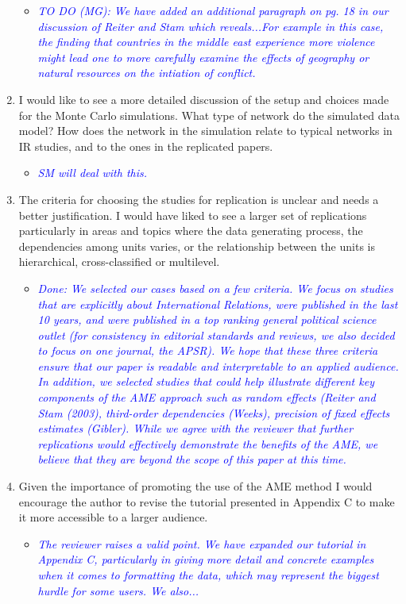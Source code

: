 \begin{enumerate}
	\begin{itemize}
		\item \textcolor{blue}{ \emph{
		TO DO (MG): We have added an additional paragraph on pg. 18 in our discussion of Reiter and Stam which reveals...For example in this case, the finding that countries in the middle east experience more violence might lead one to more carefully examine the effects of geography or natural resources on the intiation of conflict.
		}}
	\end{itemize}
	\item I would like to see a more detailed discussion of the setup and choices made for the Monte Carlo simulations. What type of network do the simulated data model? How does the network in the simulation relate to typical networks in IR studies, and to the ones in the replicated papers.
	\begin{itemize}
		\item \textcolor{blue}{ \emph{
		SM will deal with this.
		}}
	\end{itemize}
	\item The criteria for choosing the studies for replication is unclear and needs a better justification. I would have liked to see a larger set of replications particularly in areas and topics where the data generating process, the dependencies among units varies, or the relationship between the units is hierarchical, cross-classified or multilevel.
	\begin{itemize}
		\item \textcolor{blue}{ \emph{
		Done: We selected our cases based on a few criteria. We focus on studies that are explicitly about International Relations, were published in the last 10 years, and were published in a top ranking general political science outlet (for consistency in editorial standards and reviews, we also decided to focus on one journal, the APSR). We hope that these three criteria ensure that our paper is readable and interpretable to an applied audience. In addition, we selected studies that could help illustrate different key components of the AME approach such as random effects (Reiter and Stam (2003), third-order dependencies (Weeks), precision of fixed effects estimates (Gibler).  While we agree with the reviewer that further replications would effectively demonstrate the benefits of the AME, we believe that they are beyond the scope of this paper at this time.
		}}
	\end{itemize}
	\item Given the importance of promoting the use of the AME method I would encourage the author to revise the tutorial presented in Appendix C to make it more accessible to a larger audience.
	\begin{itemize}
		\item \textcolor{blue}{ \emph{
		The reviewer raises a valid point. We have expanded our tutorial in Appendix C, particularly in giving more detail and concrete examples when it comes to formatting the data, which may represent the biggest hurdle for some users. We also...
		}}
	\end{itemize}
\end{enumerate}
